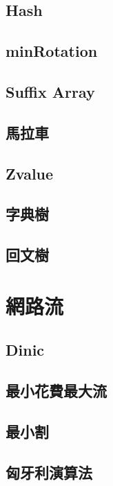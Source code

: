 \documentclass[a4paper,10pt,twocolumn,oneside]{article}
\begin{document}
\subsection{Hash}

\subsection{minRotation}

\subsection{Suffix Array}

\subsection{馬拉車}

\subsection{Zvalue}

\subsection{字典樹}

\subsection{回文樹}



\section{網路流}
\subsection{Dinic}

\subsection{最小花費最大流}

\subsection{最小割}

\subsection{匈牙利演算法}

\end{document}
